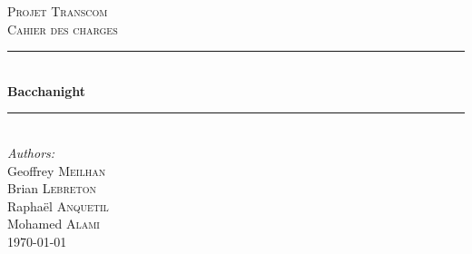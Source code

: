 \documentclass[12pt]{article}
\begin{document}
\begin{titlepage}


\newcommand{\HRule}{\rule{\linewidth}{0.5mm}} %
\center %


\textsc{\LARGE Projet Transcom}\\[1.5cm] %
\textsc{\Large Cahier des charges}\\[0.5cm] %


\HRule \\[0.4cm]
{ \huge \bfseries Bacchanight}\\[0.4cm]
\HRule \\[1.5cm]


\Large \emph{Authors:}\\
Geoffrey \textsc{Meilhan}\\
Brian \textsc{Lebreton}\\
Raphaël \textsc{Anquetil}\\
Mohamed \textsc{Alami}\\[3cm]


{\large \today}\\[3cm] %
\vfill %

\end{titlepage}

\end{document}
